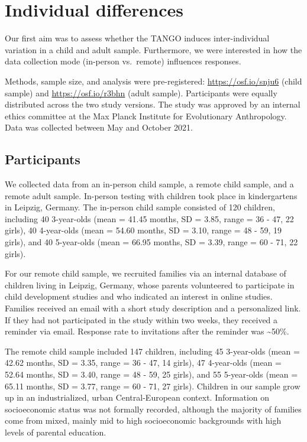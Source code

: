 \documentclass[
  man,floatsintext]{apa6}
\begin{document}
\hypertarget{individual-differences}{%
\section{Individual differences}\label{individual-differences}}

Our first aim was to assess whether the TANGO induces inter-individual variation in a child and adult sample.
Furthermore, we were interested in how the data collection mode (in-person vs.~remote) influences responses.

Methods, sample size, and analysis were pre-registered: \url{https://osf.io/snju6} (child sample) and \url{https://osf.io/r3bhn} (adult sample).
Participants were equally distributed across the two study versions.
The study was approved by an internal ethics committee at the Max Planck Institute for Evolutionary Anthropology.
Data was collected between May and October 2021.

\hypertarget{participants}{%
\subsection{Participants}\label{participants}}

We collected data from an in-person child sample, a remote child sample, and a remote adult sample.
In-person testing with children took place in kindergartens in Leipzig, Germany.
The in-person child sample consisted of 120 children, including 40 3-year-olds (mean = 41.45 months, SD = 3.85, range = 36 - 47, 22 girls), 40 4-year-olds (mean = 54.60 months, SD = 3.10, range = 48 - 59, 19 girls), and 40 5-year-olds (mean = 66.95 months, SD = 3.39, range = 60 - 71, 22 girls).

For our remote child sample, we recruited families via an internal database of children living in Leipzig, Germany, whose parents volunteered to participate in child development studies and who indicated an interest in online studies.
Families received an email with a short study description and a personalized link.
If they had not participated in the study within two weeks, they received a reminder via email.
Response rate to invitations after the reminder was \textasciitilde50\%.

The remote child sample included 147 children, including 45 3-year-olds (mean = 42.62 months, SD = 3.35, range = 36 - 47, 14 girls), 47 4-year-olds (mean = 52.64 months, SD = 3.40, range = 48 - 59, 25 girls), and 55 5-year-olds (mean = 65.11 months, SD = 3.77, range = 60 - 71, 27 girls).
Children in our sample grow up in an industrialized, urban Central-European context.
Information on socioeconomic status was not formally recorded, although the majority of families come from mixed, mainly mid to high socioeconomic backgrounds with high levels of parental education.
\end{document}
